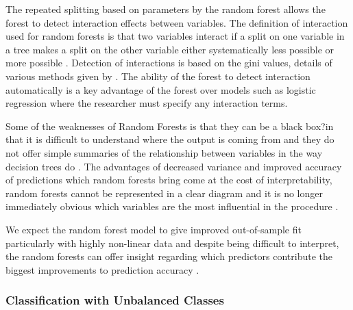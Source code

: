 \documentclass[11pt,a4paper]{article}
\begin{document}
The repeated splitting based on parameters by the random forest allows the forest to detect interaction effects between variables. The definition of interaction used for random forests is that two variables interact if a split on one variable in a tree makes a split on the other variable either systematically less possible or more possible \citep{breiman01}. Detection of interactions is based on the gini values,  details of various methods given by \citet{kelly12}. The ability of the forest to detect interaction automatically is a key advantage of the forest over models such as logistic regression where the researcher must specify any interaction terms.

Some of the weaknesses of Random Forests is that they can be a black box?in that it is difficult to understand where the output is coming from and they do not offer simple summaries of the relationship between variables in the way decision trees do \citep{varian14}. The advantages of decreased variance and improved accuracy of predictions which random forests bring come at the cost of interpretability, random forests cannot be represented in a clear diagram and it is no longer immediately obvious which variables are the most influential in the procedure \citep{james13}.

We expect the random forest model to give improved out-of-sample fit particularly with highly non-linear data and despite being difficult to interpret, the random forests can offer insight regarding which predictors contribute the biggest improvements to prediction accuracy \citep{varian14}.


\subsubsection{Classification with Unbalanced Classes}
\end{document}
